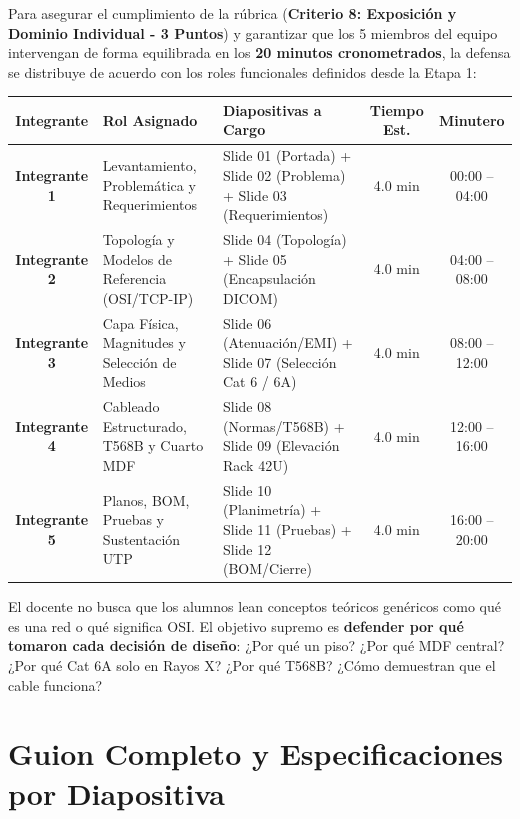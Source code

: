 \documentclass[11pt,a4paper]{article}
\begin{document}
Para asegurar el cumplimiento de la rúbrica (\textbf{Criterio 8: Exposición y Dominio Individual - 3 Puntos}) y garantizar que los 5 miembros del equipo intervengan de forma equilibrada en los \textbf{20 minutos cronometrados}, la defensa se distribuye de acuerdo con los roles funcionales definidos desde la Etapa 1:

\begin{table}[h!]
\centering
\small
\begin{tabular}{c p{3.8cm} p{4.2cm} c c}
\toprule
\textbf{Integrante} & \textbf{Rol Asignado} & \textbf{Diapositivas a Cargo} & \textbf{Tiempo Est.} & \textbf{Minutero} \\
\midrule
\textbf{Integrante 1} & Levantamiento, Problemática y Requerimientos & Slide 01 (Portada) + Slide 02 (Problema) + Slide 03 (Requerimientos) & 4.0 min & 00:00 -- 04:00 \\
\textbf{Integrante 2} & Topología y Modelos de Referencia (OSI/TCP-IP) & Slide 04 (Topología) + Slide 05 (Encapsulación DICOM) & 4.0 min & 04:00 -- 08:00 \\
\textbf{Integrante 3} & Capa Física, Magnitudes y Selección de Medios & Slide 06 (Atenuación/EMI) + Slide 07 (Selección Cat 6 / 6A) & 4.0 min & 08:00 -- 12:00 \\
\textbf{Integrante 4} & Cableado Estructurado, T568B y Cuarto MDF & Slide 08 (Normas/T568B) + Slide 09 (Elevación Rack 42U) & 4.0 min & 12:00 -- 16:00 \\
\textbf{Integrante 5} & Planos, BOM, Pruebas y Sustentación UTP & Slide 10 (Planimetría) + Slide 11 (Pruebas) + Slide 12 (BOM/Cierre) & 4.0 min & 16:00 -- 20:00 \\
\bottomrule
\end{tabular}
\end{table}

\begin{tcolorbox}[colback=lightgray,colframe=accentblue,title=\textbf{Directiva Crítica del Jurado (Rúbrica de Evaluación)}]
El docente no busca que los alumnos lean conceptos teóricos genéricos como qué es una red o qué significa OSI. El objetivo supremo es \textbf{defender por qué tomaron cada decisión de diseño}: ¿Por qué un piso? ¿Por qué MDF central? ¿Por qué Cat 6A solo en Rayos X? ¿Por qué T568B? ¿Cómo demuestran que el cable funciona?
\end{tcolorbox}

\newpage

\section{Guion Completo y Especificaciones por Diapositiva}
\end{document}
